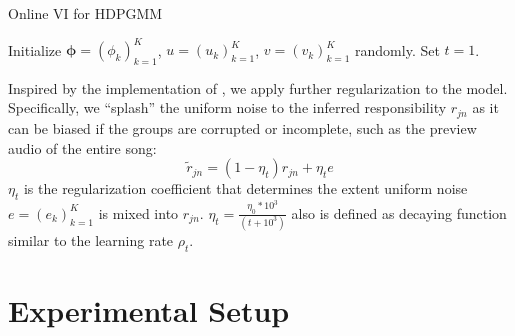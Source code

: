 \documentclass{article}
\begin{document}
\begin{algorithm}
\caption{Online VI for HDPGMM}\label{alg:inference}
Initialize $\mathbf{\phi}=(\phi_{k})^{K}_{k=1}$, $u=(u_{k})^{K}_{k=1}$, $v=(v_{k})^{K}_{k=1}$ randomly. Set $t=1$.\\
\end{algorithm}


Inspired by the implementation of \cite{DBLP:journals/jmlr/WangPB11, 10.1214/06-BA104}, we apply further regularization to the model. Specifically, we ``splash'' the uniform noise to the inferred responsibility $r_{jn}$ as it can be biased if the groups are corrupted or incomplete, such as the preview audio of the entire song:
\begin{equation}\label{eq:additional_regularization}
    \tilde{r}_{jn} = (1 - \eta_{t}) r_{jn} + \eta_{t} e
\end{equation}
$\eta_{t}$ is the regularization coefficient that determines the extent uniform noise $e = (e_{k})_{k=1}^{K}$ is mixed into $r_{jn}$. $\eta_{t} = \frac{\eta_{0} * 10^{3}}{(t + 10^{3})}$ also is defined as decaying function similar to the learning rate $\rho_{t}$.





\section{Experimental Setup}\label{sec:experimental_setup}
\end{document}
